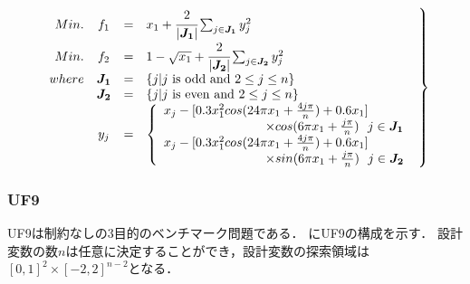 \documentclass[../main/main]{subfiles}
\begin{document}
\begin{eqnarray} 
\left.
\begin{array}{rccl}
Min. &f_1 &=& x_1 + \cfrac{2}{|\bm{J_1}|} \sum_{j \in \bm{J_1}} y^2_j\\
Min. & f_2 &=& 1 - \sqrt{x_1} + \cfrac{2}{|\bm{J_2}|} \sum_{j \in \bm{J_2}} y^2_j\\

where &  \bm{J_1} &=& \{j|j {\rm \ is \ odd \ and \ } 2 \leq j \leq n\}\\
& \bm{J_2} &=& \{j|j {\rm \ is \ even \ and \ } 2 \leq j \leq n\}\\
& y_j &=& \left\{ 
\begin{array}{l}
x_j - [0.3 x^2_1 cos (24 \pi x_1 + \frac{4j\pi}{n}) + 0.6x_1] \\
\qquad \qquad \qquad \qquad \times cos(6 \pi x_1 + \frac{j \pi}{n}) \ \ j \in \bm{J_1}\\
x_j - [0.3 x^2_1 cos (24 \pi x_1 + \frac{4j\pi}{n}) + 0.6x_1]\\
\qquad \qquad \qquad \qquad \times sin(6 \pi x_1 + \frac{j \pi}{n}) \ \ j \in \bm{J_2}\\
\end{array}
\right.
   \label{uf2_eq} 
\end{array}
\right\}
\end{eqnarray}


\subsubsection{UF9}
UF9は制約なしの3目的のベンチマーク問題である．
にUF9の構成を示す．
設計変数の数$n$は任意に決定することができ，設計変数の探索領域は$[0,1]^2 \times [-2,2]^{n-2}$となる．
\end{document}
